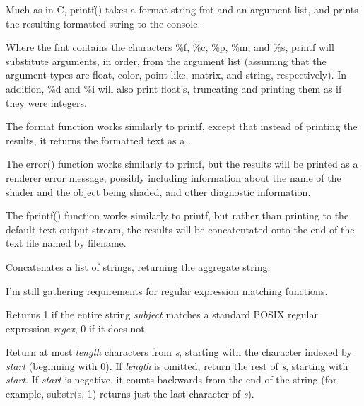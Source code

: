 \documentclass[11pt,letterpaper]{book}
\def\color{{\cf color}\xspace}
\def\float{{\cf float}\xspace}
\def\matrix{{\cf matrix}\xspace}
\begin{document}

Much as in C, {\cf printf()} takes a format string {\cf fmt} and an argument list, and
prints the resulting formatted string to the console.  

Where the
fmt contains the characters {\cf \%f}, {\cf \%c}, {\cf \%p}, {\cf
\%m}, and {\cf \%s}, {\cf printf} will substitute arguments, in order,
from the argument list (assuming that the argument types are \float,
\color, point-like, \matrix, and {\cf string}, respectively).  In addition,
{\cf \%d} and {\cf \%i} will also print \float's, truncating and
printing them as if they were integers.
\apiend

The {\cf format} function works similarly to {\cf printf}, except that
instead of printing the results, it returns the formatted text as a
\string.
\apiend

The {\cf error()} function works similarly to {\cf printf}, but the
results will be printed as a renderer error message, possibly including
information about the name of the shader and the object being shaded,
and other diagnostic information.
\apiend

The {\cf fprintf()} function works similarly to {\cf printf}, but rather
than printing to the default text output stream, the results will be
concatentated onto the end of the text file named by {\cf filename}.
\apiend

Concatenates a list of strings, returning the aggregate string.
\apiend

\begin{annotate}
I'm still gathering requirements for regular expression matching
functions.
\end{annotate}

Returns 1 if the entire string \emph{subject} matches a standard POSIX 
regular expression \emph{regex}, 0 if it does not.
\apiend

Return at most \emph{length} characters from \emph{s}, starting with the
character indexed by \emph{start} (beginning with 0).  If \emph{length}
is omitted, return the rest of \emph{s}, starting with \emph{start}.  If
\emph{start} is negative, it counts backwards from the end of the string
(for example, {\cf substr(s,-1)} returns just the last character of
\emph{s}).
\apiend
\end{document}

